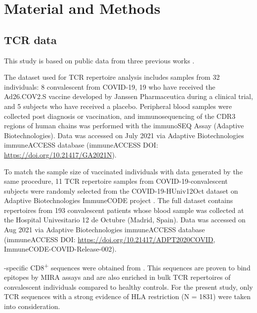 \chapter*{Material and Methods}
\label{cap:met}


\section*{TCR data}


This study is based on public data from three previous works \citep{janssen, immunecode, metaclonotypes}.

The dataset used for TCR repertoire analysis \citep{janssen} includes samples from 32 individuals: 8 convalescent from COVID-19, 19 who have received the Ad26.COV2.S vaccine developed by Janssen Pharmaceutica during a clinical trial, and 5 subjects who have received a placebo. Peripheral blood samples were collected post diagnosis or vaccination, and immunosequencing of the CDR3 regions of human \TCRB{} chains was performed with the immunoSEQ Assay (Adaptive Biotechnologies). Data was accessed on July 2021 via Adaptive Biotechnologies immuneACCESS\textregistered{} database (immuneACCESS\textregistered{} DOI: \url{https://doi.org/10.21417/GA2021N}).

To match the sample size of vaccinated individuals with data generated by the same procedure, 11 TCR repertoire samples from COVID-19-convalescent subjects were randomly selected from the COVID-19-HUniv12Oct dataset on Adaptive Biotechnologies ImmuneCODE\texttrademark{} project \citep{immunecode}. The full dataset contains \TCRB{} repertoires from 193 convalescent patients whose blood sample was collected at the Hospital Univesitario 12 de Octubre (Madrid, Spain). Data was accessed on Aug 2021 via Adaptive Biotechnologies immuneACCESS\textregistered{} database (immuneACCESS\textregistered{} DOI: \url{https://doi.org/10.21417/ADPT2020COVID}, ImmuneCODE-COVID-Release-002).


\covid-specific CD8\textsuperscript{+} \TCRB{} sequences were obtained from \cite{metaclonotypes}. This sequences are proven to bind \covid{} epitopes by MIRA assays \citep{immunecode} and are also enriched in bulk TCR repertoires of convalescent individuals compared to healthy controls. For the present study, only TCR sequences with a strong evidence of HLA restriction (N = 1831) were taken into consideration.



